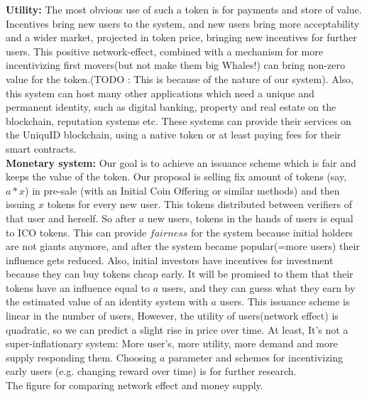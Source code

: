 \documentclass[conference]{IEEEtran}
\begin{document}
\textbf{Utility:} The most obvious use of such a token is for payments and store of value. Incentives bring new users to the system, and new users bring more acceptability and a wider market, projected in token price, bringing new incentives for further users. This positive network-effect, combined with a mechanism for more incentivizing first movers(but not make them big Whales!) can bring non-zero value for the token.(TODO : This is because of the nature of our system). Also, this system can host many other applications which need a unique and permanent identity, such as digital banking, property and real estate on the blockchain, reputation systems etc. These systems can provide their services on the UniquID blockchain, using a native token or at least paying fees for their smart contracts.
\\

\textbf{Monetary system:} Our goal is to achieve an issuance scheme which is fair and keeps the value of the token. Our proposal is selling fix amount of tokens (say, $a*x$) in pre-sale (with an Initial Coin Offering or similar methods) and then issuing $x$ tokens for every new user. This tokens distributed between verifiers of that user and herself. So after $a$ new users, tokens in the hands of users is equal to ICO tokens. This can provide $fairness$ for the system because initial holders are not giants anymore, and after the system became popular(=more users) their influence gets reduced. Also, initial investors have incentives for investment because they can buy tokens cheap early. It will be promised to them that their tokens have an influence equal to $a$ users, and they can guess what they earn by the estimated value of an identity system with $a$ users. This issuance scheme is linear in the number of users, However, the utility of users(network effect) is quadratic, so we can predict a slight rise in price over time. At least, It's not a super-inflationary system: More user's, more utility, more demand and more supply responding them. Choosing $a$ parameter and schemes for incentivizing early users (e.g. changing reward over time) is for further research.\\ 



The figure for comparing network effect and money supply.
\end{document}

